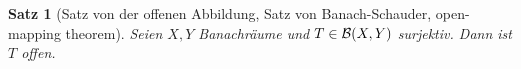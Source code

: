 \documentclass[ngerman]{report}
\theoremstyle{plain}%
\newtheorem{thm}{Satz}[chapter]
\theoremstyle{definition}%
\theoremstyle{myStyle}
\begin{document}
	\begin{thm}[Satz von der offenen Abbildung, Satz von Banach-Schauder, open-mapping theorem]
		Seien $X,Y$ Banachräume und $T\in \BS$ surjektiv. Dann ist $T$ offen.	
	\end{thm}
%		
%		 
\end{document}
